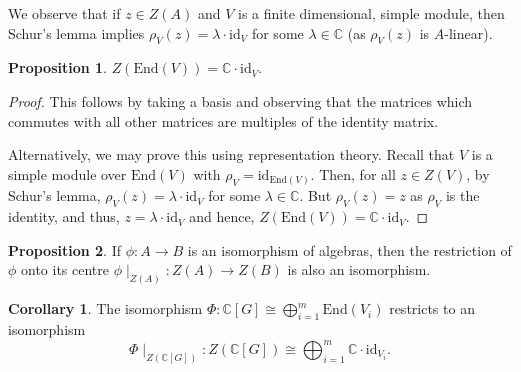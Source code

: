 \documentclass[]{article}
\theoremstyle{definition}
\newtheorem{corollary}{Corollary}[theorem]
\theoremstyle{definition}
\newtheorem{proposition}{Proposition}[section]
\begin{document}
We observe that if \(z \in Z(A)\) and \(V\) is a finite dimensional, simple module, 
then Schur's lemma implies \(\rho_V(z) = \lambda \cdot \text{id}_V\) for 
some \(\lambda \in \mathbb{C}\) (as \(\rho_V(z)\) is \(A\)-linear).

\begin{proposition}
  \(Z(\text{End}(V)) = \mathbb{C} \cdot \text{id}_V\).
\end{proposition}
\begin{proof}
  This follows by taking a basis and observing that the matrices which commutes 
  with all other matrices are multiples of the identity matrix. 

  Alternatively, we may prove this using representation theory. Recall that 
  \(V\) is a simple module over \(\text{End}(V)\) with 
  \(\rho_V = \text{id}_{\text{End}(V)}\). Then, for all \(z \in Z(V)\), 
  by Schur's lemma, \(\rho_V(z) = \lambda \cdot \text{id}_V\) for some 
  \(\lambda \in \mathbb{C}\). But \(\rho_V(z) = z\) as \(\rho_V\) is the 
  identity, and thus, \(z = \lambda \cdot \text{id}_V\) and hence, 
  \(Z(\text{End}(V)) = \mathbb{C} \cdot \text{id}_V\).
\end{proof}

\begin{proposition}
  If \(\phi : A \to B\) is an isomorphism of algebras, then the restriction of 
  \(\phi\) onto its centre \(\phi\mid_{Z(A)} : Z(A) \to Z(B)\) is also an 
  isomorphism.
\end{proposition}

\begin{corollary}
  The isomorphism \(\Phi : \mathbb{C}[G] \cong \bigoplus_{i = 1}^m \text{End}(V_i)\) 
  restricts to an isomorphism 
  \[\Phi\mid_{Z(\mathbb{C}[G])} : Z(\mathbb{C}[G]) \cong \bigoplus_{i = 1}^m 
    \mathbb{C} \cdot \text{id}_{V_i}.\]
\end{corollary}
\end{document}
